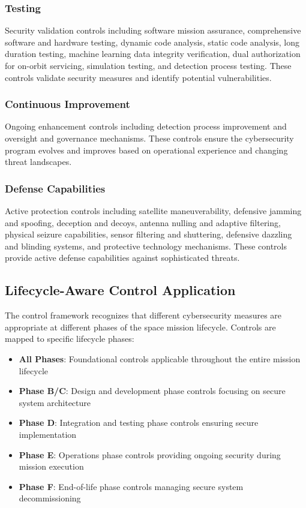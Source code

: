 \documentclass[binding=0.6cm]{sapthesis}
\begin{document}
\subsubsection{Testing}
Security validation controls including software mission assurance, comprehensive software and hardware testing, dynamic code analysis, static code analysis, long duration testing, machine learning data integrity verification, dual authorization for on-orbit servicing, simulation testing, and detection process testing. These controls validate security measures and identify potential vulnerabilities.

\subsubsection{Continuous Improvement}
Ongoing enhancement controls including detection process improvement and oversight and governance mechanisms. These controls ensure the cybersecurity program evolves and improves based on operational experience and changing threat landscapes.

\subsubsection{Defense Capabilities}
Active protection controls including satellite maneuverability, defensive jamming and spoofing, deception and decoys, antenna nulling and adaptive filtering, physical seizure capabilities, sensor filtering and shuttering, defensive dazzling and blinding systems, and protective technology mechanisms. These controls provide active defense capabilities against sophisticated threats.

\subsection{Lifecycle-Aware Control Application}

The control framework recognizes that different cybersecurity measures are appropriate at different phases of the space mission lifecycle. Controls are mapped to specific lifecycle phases:

\begin{itemize}
    \item \textbf{All Phases}: Foundational controls applicable throughout the entire mission lifecycle
    \item \textbf{Phase B/C}: Design and development phase controls focusing on secure system architecture
    \item \textbf{Phase D}: Integration and testing phase controls ensuring secure implementation
    \item \textbf{Phase E}: Operations phase controls providing ongoing security during mission execution
    \item \textbf{Phase F}: End-of-life phase controls managing secure system decommissioning
\end{itemize}
\end{document}
